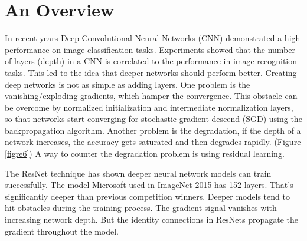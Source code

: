 \documentclass[12pt]{article}
\numberwithin{equation}{section}
\numberwithin{table}{section}
\numberwithin{figure}{section}
\begin{document}
%

\section{An Overview}

In recent years Deep Convolutional Neural Networks (CNN) demonstrated a high performance on image classification tasks. Experiments showed that the number of layers (depth) in a CNN is correlated to the performance in image recognition tasks.  This led to the idea that deeper networks should perform better. Creating deep networks is not as simple as adding layers. One problem is the vanishing/exploding gradients, which hamper the convergence. This obstacle can be overcome by normalized initialization and intermediate normalization layers, so that networks start converging for stochastic gradient descend (SGD) using the backpropagation algorithm. Another problem is the degradation, if the depth of a network increases, the accuracy gets saturated and then degrades rapidly. (Figure \ref{figre6}) A way to counter the degradation problem is using residual learning. 



The ResNet technique has shown deeper neural network models can train successfully. The model Microsoft used in ImageNet 2015 has 152 layers. That’s significantly deeper than previous competition winners. Deeper models tend to hit obstacles during the training process. The gradient signal vanishes with increasing network depth. But the identity connections in ResNets propagate the gradient throughout the model.
\end{document}
